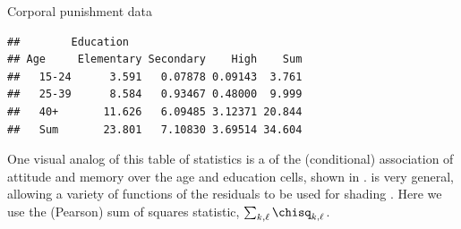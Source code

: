 \documentclass[11pt]{book}
\renewenvironment{knitrout}{\small\renewcommand{\baselinestretch}{.85}}{} %
\begin{document}
\begin{Example}[punish]{Corporal punishment data}
\begin{knitrout}
\color{fgcolor}\begin{kframe}
\begin{alltt}
 \hlkwb{<-}  \hlstd{(}\hlstd{,} \hlstd{),}
                   \hlstd{(}\hlstd{)} \hlstd{(}\hlopt{~} \hlopt{+}  
 \hlkwb{<-} \hlstd{(}  \hlstd{(}\hlopt{$} \hlstd{,} \hlstd{)}
 \hlkwb{<-} 
\end{alltt}
\begin{verbatim}
##        Education
## Age     Elementary Secondary    High    Sum
##   15-24      3.591   0.07878 0.09143  3.761
##   25-39      8.584   0.93467 0.48000  9.999
##   40+       11.626   6.09485 3.12371 20.844
##   Sum       23.801   7.10830 3.69514 34.604
\end{verbatim}
\end{kframe}
\end{knitrout}
One visual analog of this table of \chisq statistics is a  of the
(conditional) association of attitude and memory over the age and education cells,
shown in .   is very general, allowing
a variety of functions of the residuals to be used for shading
\citep{Zeileis-etal:2007}.
Here we use
the (Pearson) sum of squares statistic, $\sum_{k, \ell} \chisq_{k,\ell}$.
\begin{knitrout}
\color{fgcolor}\begin{kframe}
\begin{alltt}
\hlstd{(}\hlstd{)}
 \hlkwb{<-}   \hlstd{=} \hlopt{:}\hlstd{,}  \hlstd{=} \hlstd{,}
   \hlstd{=} \hlstd{,}  \hlstd{=} \hlstd{(}\hlstd{,} \hlstd{,} \hlstd{,} \hlstd{),}
   \hlstd{=} \hlstd{,}  \hlstd{=} \hlopt{:}\hlstd{)}
\hlstd{(}\hlopt{~}  \hlopt{+}  \hlopt{|}  \hlopt{+}   \hlstd{=}
              
\end{alltt}
\end{kframe}\begin{figure}[!htb]



\end{figure}
\end{knitrout}
\end{Example}
\end{document}
